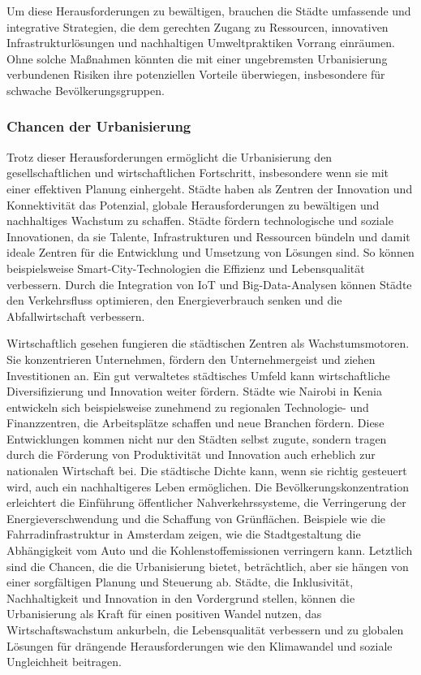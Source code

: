 \documentclass[conference,compsoc,final,a4paper, onecolumn, 11pt]{IEEEtran}
\begin{document}
Um diese Herausforderungen zu bewältigen, brauchen die Städte umfassende und integrative Strategien, die dem gerechten Zugang zu Ressourcen, innovativen Infrastrukturlösungen und nachhaltigen Umweltpraktiken Vorrang einräumen. 
Ohne solche Maßnahmen könnten die mit einer ungebremsten Urbanisierung verbundenen Risiken ihre potenziellen Vorteile überwiegen, insbesondere für schwache Bevölkerungsgruppen.


\subsubsection{Chancen der Urbanisierung}
Trotz dieser Herausforderungen ermöglicht die Urbanisierung den gesellschaftlichen und wirtschaftlichen Fortschritt, insbesondere wenn sie mit einer effektiven Planung einhergeht. 
Städte haben als Zentren der Innovation und Konnektivität das Potenzial, globale Herausforderungen zu bewältigen und nachhaltiges Wachstum zu schaffen. \autocite[S. 5ff]{zhang_trends_2015}
Städte fördern technologische und soziale Innovationen, da sie Talente, Infrastrukturen und Ressourcen bündeln und damit ideale Zentren für die Entwicklung und Umsetzung von Lösungen sind. \autocite[S. 5ff]{zhang_trends_2015}
So können beispielsweise Smart-City-Technologien die Effizienz und Lebensqualität verbessern. 
Durch die Integration von \ac{IoT} und Big-Data-Analysen können Städte den Verkehrsfluss optimieren, den Energieverbrauch senken und die Abfallwirtschaft verbessern. 

Wirtschaftlich gesehen fungieren die städtischen Zentren als Wachstumsmotoren. 
Sie konzentrieren Unternehmen, fördern den Unternehmergeist und ziehen Investitionen an. 
Ein gut verwaltetes städtisches Umfeld kann wirtschaftliche Diversifizierung und Innovation weiter fördern. \autocite[S. 5ff]{zhang_trends_2015}
Städte wie Nairobi in Kenia entwickeln sich beispielsweise zunehmend zu regionalen Technologie- und Finanzzentren, die Arbeitsplätze schaffen und neue Branchen fördern. 
Diese Entwicklungen kommen nicht nur den Städten selbst zugute, sondern tragen durch die Förderung von Produktivität und Innovation auch erheblich zur nationalen Wirtschaft bei. \autocite{okland_nairobis_2019}
Die städtische Dichte kann, wenn sie richtig gesteuert wird, auch ein nachhaltigeres Leben ermöglichen. 
Die Bevölkerungskonzentration erleichtert die Einführung öffentlicher Nahverkehrssysteme, die Verringerung der Energieverschwendung und die Schaffung von Grünflächen. 
Beispiele wie die Fahrradinfrastruktur in Amsterdam zeigen, wie die Stadtgestaltung die Abhängigkeit vom Auto und die Kohlenstoffemissionen verringern kann. \autocite{buehler_cycling_2010}
Letztlich sind die Chancen, die die Urbanisierung bietet, beträchtlich, aber sie hängen von einer sorgfältigen Planung und Steuerung ab. 
Städte, die Inklusivität, Nachhaltigkeit und Innovation in den Vordergrund stellen, können die Urbanisierung als Kraft für einen positiven Wandel nutzen, das Wirtschaftswachstum ankurbeln, die Lebensqualität verbessern und zu globalen Lösungen für drängende Herausforderungen wie den Klimawandel und soziale Ungleichheit beitragen.
\end{document}
